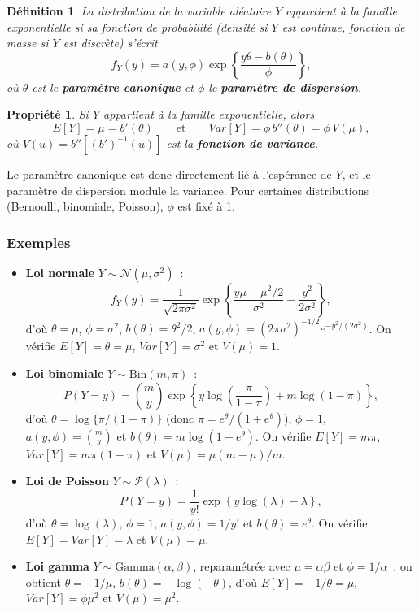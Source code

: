 \documentclass[11pt,letterpaper]{article}
\newtheorem{definition}{Définition}[section]
\newtheorem{propriete}{Propriété}[section]
\begin{document}
\begin{definition}
La distribution de la variable aléatoire $Y$ appartient à la famille exponentielle si sa fonction de probabilité (densité si $Y$ est continue, fonction de masse si $Y$ est discrète) s'écrit
$$f_Y(y) = a(y,\phi)\exp\left\{\frac{y\theta - b(\theta)}{\phi}\right\},$$
où $\theta$ est le \textbf{paramètre canonique} et $\phi$ le \textbf{paramètre de dispersion}.
\end{definition}

\begin{propriete}
\label{prop:famexp}
Si $Y$ appartient à la famille exponentielle, alors
$$E[Y] = \mu = b'(\theta) \qquad \mbox{et} \qquad Var[Y] = \phi\, b''(\theta) = \phi\, V(\mu),$$
où $V(u) = b''\!\left[(b')^{-1}(u)\right]$ est la \textbf{fonction de variance}.
\end{propriete}

Le paramètre canonique est donc directement lié à l'espérance de $Y$, et le paramètre de dispersion module la variance. Pour certaines distributions (Bernoulli, binomiale, Poisson), $\phi$ est fixé à 1.

\subsubsection{Exemples}

\begin{itemize}
\item \textbf{Loi normale} $Y\sim\mathcal{N}(\mu,\sigma^2)$~:
$$f_Y(y) = \frac{1}{\sqrt{2\pi\sigma^2}}\exp\left\{\frac{y\mu - \mu^2/2}{\sigma^2} - \frac{y^2}{2\sigma^2}\right\},$$
d'où $\theta = \mu$, $\phi = \sigma^2$, $b(\theta) = \theta^2/2$, $a(y,\phi) = (2\pi\sigma^2)^{-1/2}e^{-y^2/(2\sigma^2)}$. On vérifie $E[Y] = \theta = \mu$, $Var[Y] = \sigma^2$ et $V(\mu) = 1$.

\item \textbf{Loi binomiale} $Y\sim\mathrm{Bin}(m,\pi)$~:
$$P(Y=y) = \binom{m}{y}\exp\left\{y\log\!\left(\frac{\pi}{1-\pi}\right) + m\log(1-\pi)\right\},$$
d'où $\theta = \log\{\pi/(1-\pi)\}$ (donc $\pi = e^\theta/(1+e^\theta)$), $\phi = 1$, $a(y,\phi) = \binom{m}{y}$ et $b(\theta) = m\log(1+e^\theta)$. On vérifie $E[Y] = m\pi$, $Var[Y] = m\pi(1-\pi)$ et $V(\mu) = \mu(m-\mu)/m$.

\item \textbf{Loi de Poisson} $Y\sim\mathcal{P}(\lambda)$~:
$$P(Y=y) = \frac{1}{y!}\exp\left\{y\log(\lambda) - \lambda\right\},$$
d'où $\theta = \log(\lambda)$, $\phi = 1$, $a(y,\phi) = 1/y!$ et $b(\theta) = e^\theta$. On vérifie $E[Y] = Var[Y] = \lambda$ et $V(\mu) = \mu$.

\item \textbf{Loi gamma} $Y\sim\mathrm{Gamma}(\alpha,\beta)$, reparamétrée avec $\mu = \alpha\beta$ et $\phi = 1/\alpha$~: on obtient $\theta = -1/\mu$, $b(\theta) = -\log(-\theta)$, d'où $E[Y] = -1/\theta = \mu$, $Var[Y] = \phi\mu^2$ et $V(\mu) = \mu^2$.
\end{itemize}
\end{document}
